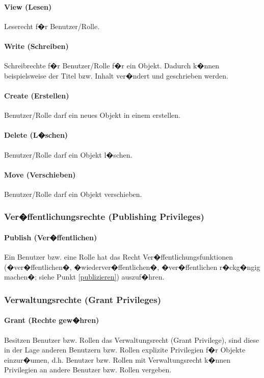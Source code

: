 \paragraph{View (Lesen)}
Leserecht f�r Benutzer/Rolle.

\paragraph{Write (Schreiben)}
Schreibrechte f�r Benutzer/Rolle f�r ein Objekt. Dadurch k�nnen beispielsweise der
Titel bzw. Inhalt ver�ndert und geschrieben werden.

\paragraph{Create (Erstellen)}
Benutzer/Rolle darf ein neues Objekt in einem  erstellen.

\paragraph{Delete (L�schen)}
Benutzer/Rolle darf ein Objekt l�schen.

\paragraph{Move (Verschieben)}
Benutzer/Rolle darf ein Objekt verschieben.

\subsubsection{Ver�ffentlichungsrechte (Publishing Privileges)}
\label{pubrechte}
\paragraph{Publish (Ver�ffentlichen)} Ein Benutzer bzw. eine Rolle hat das Recht Ver�ffentlichungsfunktionen
(�ver�ffentlichen�, �wiederver�ffentlichen�, �ver�ffentlichen
r�ckg�ngig machen�; siehe Punkt \ref{publizieren}) auszuf�hren.

\subsubsection{Verwaltungsrechte (Grant Privileges)}
\label{verwrechte}

\paragraph{Grant (Rechte gew�hren)} Besitzen Benutzer bzw. Rollen das Verwaltungsrecht (Grant Privilege), sind diese in
der Lage anderen Benutzern bzw. Rollen explizite Privilegien f�r Objekte
einzur�umen, d.h. Benutzer bzw. Rollen mit Verwaltungsrecht k�nnen Privilegien an
andere Benutzer bzw. Rollen vergeben.


